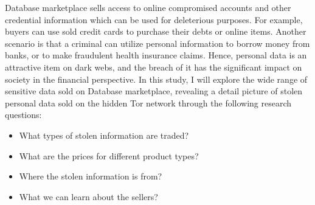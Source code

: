 Database marketplace sells access to online compromised accounts and other
credential information which can be used for deleterious purposes. For example,
buyers can use sold credit cards to purchase their debts or online items. Another
scenario is that a criminal can utilize personal information to borrow money from
banks, or to make fraudulent health insurance claims\cite{web:personal_info_darkweb}.
Hence, personal data is an attractive item on dark webs, and the breach of it has the
significant impact on society in the financial perspective. In this study, I will
explore the wide range of sensitive data sold on Database marketplace, revealing a
detail picture of stolen personal data sold on the hidden Tor network through the
following research questions:

\begin{itemize}
    \item What types of stolen information are traded?\label{rq:type}
    \item What are the prices for different product types?\label{rq:price}
    \item Where the stolen information is from?\label{rq:where}
    \item What we can learn about the sellers?\label{rq:seller}
\end{itemize}